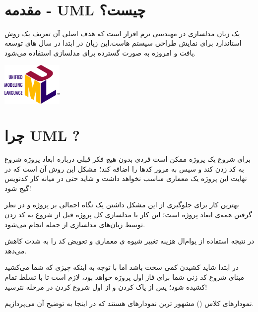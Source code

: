 \documentclass[]{article}
\begin{document}
\KashidaOff


 \Large \textbf{\\
}


\section*{{\titr مقدمه - UML چیست؟}}

 یک زبان مدلسازی در مهندسی نرم افزار است که هدف اصلی آن تعریف یک روش استاندارد برای نمایش طراحی سیستم هاست.این زبان در ابتدا در سال های   توسعه یافت و امروزه به صورت گسترده برای مدلسازی استفاده می‌شود.

\begin{center}

\includegraphics[width=0.22\textwidth]{images/image4.png}

\end{center}



\section*{{\titr چرا UML ?}}

برای شروع یک پروژه ممکن است فردی بدون هیچ فکر قبلی درباره ابعاد پروژه شروع به کد زدن کند و سپس به مرور کدها را اضافه کند؛ مشکل این روش آن است که در نهایت این پروژه یک معماری مناسب نخواهد داشت و شاید حتی در میانه کار کدنویس گیج شود!

 بهترین کار برای جلوگیری از این مشکل داشتن یک نگاه اجمالی بر پروژه  و در نظر گرفتن همه‌ی ابعاد پروژه است؛ این کار با مدلسازی کل پروژه قبل از شروع به کد زدن توسط زبان‌های مدلسازی از جمله  انجام می‌شود.
 
در نتیجه استفاده از یو‌ام‌ال هزینه تغییر شیوه ی معماری و تعویض کد را به شدت کاهش می‌دهد.

در ابتدا شاید کشیدن  کمی سخت باشد اما با توجه به اینکه چیزی که شما می‌کشید مبنای شروع کد زنی شما برای فاز اول پروژه خواهد بود، لازم است تا با تسلط تمام کشیده شود؛ پس از پاک کردن و از اول شروع کردن در مرحله  نترسید! 

نمودارهای کلاس () مشهور ترین نمودارهای  هستند که در اینجا به توضیح آن می‌پردازیم.

\newpage
\end{document}
